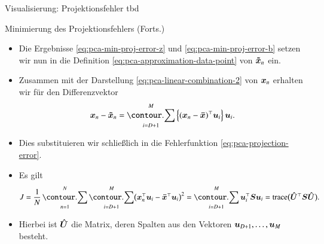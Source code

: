 \begin{frame}{Visualisierung: Projektionsfehler}{}
	tbd
\end{frame}


\begin{frame}{Minimierung des Projektionsfehlers (Forts.)}{}
	\begin{itemize}
		\item Die Ergebnisse \eqref{eq:pca-min-proj-error-z} und \eqref{eq:pca-min-proj-error-b} setzen wir nun in
			die Definition \eqref{eq:pca-approximation-data-point} von $\bm{\tilde{x}}_n$ ein.
		\item Zusammen mit  der Darstellung \eqref{eq:pca-linear-combination-2} von $\bm{x}_n$ erhalten wir für den Differenzvektor
		\begin{equation}
			\bx_n - \bxtilde_n = \sum_{i=D+1}^M \left\{ (\bx_n - \bxmean)^\top \bu_i \right\} \bu_i.
		\end{equation}
		\item Dies substituieren wir schließlich in die Fehlerfunktion \eqref{eq:pca-projection-error}.
		\item Es gilt
		\begin{equation} \label{eq:pca-projection-error-2}
			J
				= \frac{1}{N} \sum_{n=1}^N \sum_{i=D+1}^M \bigl( \bx_n^\top \bu_i - \bxmean^\top \bu_i \bigr)^2
				= \sum_{i=D+1}^M \bu_i^\top \bS \bu_i
				= \trace\bigl( \bUhat^\top \bS \bUhat \bigr).
		\end{equation}
		\item Hierbei ist $\bm{\hat{U}}$ die Matrix, deren Spalten aus den Vektoren $\bm{u}_{D+1}, \ldots, \bm{u}_M$ besteht.
	\end{itemize}
\end{frame}


